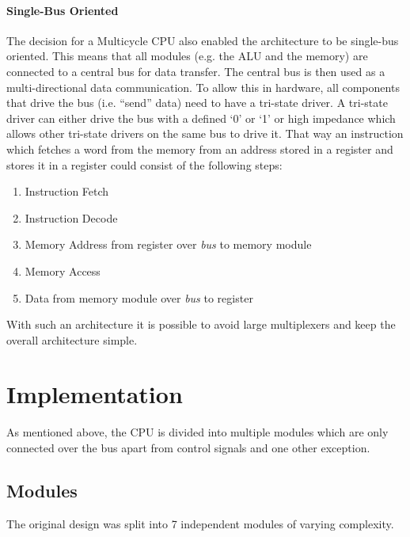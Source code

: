 \paragraph{Single-Bus Oriented}
The decision for a Multicycle \gls{CPU} also enabled the architecture to be single-bus oriented.
This means that all modules (e.g. the \gls{ALU} and the memory) are connected to a central bus for data transfer.
The central bus is then used as a multi-directional data communication.
To allow this in hardware, all components that drive the bus (i.e. ``send'' data) need to have a tri-state driver.
A tri-state driver can either drive the bus with a defined `0' or `1' or high impedance which allows other tri-state drivers on the same bus to drive it.
That way an instruction which fetches a word from the memory from an address stored in a register and stores it in a register could consist of the following steps:
\begin{enumerate}
  \item Instruction Fetch
  \item Instruction Decode
  \item Memory Address from register over \emph{bus} to memory module
  \item Memory Access
  \item Data from memory module over \emph{bus} to register
\end{enumerate}
With such an architecture it is possible to avoid large multiplexers and keep the overall architecture simple.

\section{Implementation}
As mentioned above, the \gls{CPU} is divided into multiple modules which are only connected over the bus apart from control signals and one other exception.
\subsection{Modules}
The original design was split into 7 independent modules of varying complexity.
